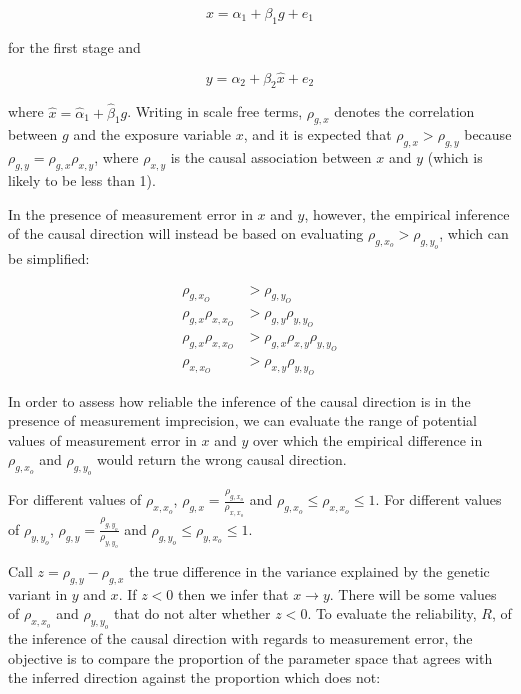 \documentclass[]{article}
\begin{document}
\[
x = \alpha_1 + \beta_1 g + e_1
\]

for the first stage and

\[
y = \alpha_2 + \beta_2 \hat{x} + e_2
\]

where \(\hat{x} = \hat{\alpha}_1 + \hat{\beta}_1 g\). Writing in scale
free terms, \(\rho_{g, x}\) denotes the correlation between \(g\) and
the exposure variable \(x\), and it is expected that
\(\rho_{g, x} > \rho_{g, y}\) because
\(\rho_{g, y} = \rho_{g, x}\rho_{x, y}\), where \(\rho_{x, y}\) is the
causal association between \(x\) and \(y\) (which is likely to be less
than 1).

In the presence of measurement error in \(x\) and \(y\), however, the
empirical inference of the causal direction will instead be based on
evaluating \(\rho_{g, x_o} > \rho_{g, y_o}\), which can be simplified:

\[
\begin{aligned}
\rho_{g, x_O} & > \rho_{g, y_O} \\
\rho_{g, x} \rho_{x, x_O} & > \rho_{g,y}\rho_{y,y_O}\\
\rho_{g, x} \rho_{x, x_O} & > \rho_{g,x}\rho_{x,y}\rho_{y,y_O}\\
\rho_{x, x_O} & > \rho_{x,y}\rho_{y,y_O}
\end{aligned}
\]

In order to assess how reliable the inference of the causal direction is
in the presence of measurement imprecision, we can evaluate the range of
potential values of measurement error in \(x\) and \(y\) over which the
empirical difference in \(\rho_{g, x_o}\) and \(\rho_{g, y_o}\) would
return the wrong causal direction.

For different values of \(\rho_{x,x_o}\),
\(\rho_{g,x} = \frac{\rho_{g, x_o}}{\rho_{x,x_o}}\) and
\(\rho_{g,x_o} \leq \rho_{x,x_o} \leq 1\). For different values of
\(\rho_{y,y_o}\), \(\rho_{g,y} = \frac{\rho_{g, y_o}}{\rho_{y,y_o}}\)
and \(\rho_{g,y_o} \leq \rho_{y,x_o} \leq 1\).

Call \(z = \rho_{g,y} - \rho_{g,x}\) the true difference in the variance
explained by the genetic variant in \(y\) and \(x\). If \(z < 0\) then
we infer that \(x \rightarrow y\). There will be some values of
\(\rho_{x,x_o}\) and \(\rho_{y,y_o}\) that do not alter whether
\(z < 0\). To evaluate the reliability, \(R\), of the inference of the
causal direction with regards to measurement error, the objective is to
compare the proportion of the parameter space that agrees with the
inferred direction against the proportion which does not:
\end{document}
